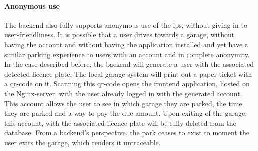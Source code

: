 \paragraph{Anonymous use}
The backend also fully supports anonymous use of the \ac{ips}, without giving in to user-friendliness. 
It is possible that a user drives towards a garage, without having the account and without having the application installed and yet have a similar parking experience to users with an account and in complete anonymity. In the case described before, the backend will generate a user with the associated detected licence plate. The local garage system will print out a paper ticket with a \ac{qr}-code on it. Scanning this \ac{qr}-code opens the frontend application, hosted on the Nginx-server, with the user already logged in with the generated account. This account allows the user to see in which garage they are parked, the time they are parked and a way to pay the due amount. Upon exiting of the garage, this account, with the associated licence plate will be fully deleted from the database. From a backend's perspective, the park ceases to exist to moment the user exits the garage, which renders it untraceable.